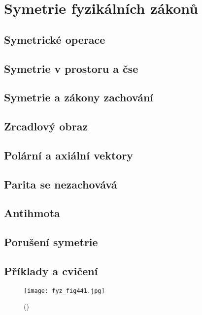 \chapter{Symetrie fyzikálních zákonů}\label{fyz:IchapLII}
\minitoc
  \section{Symetrické operace}\label{fyz:IchapLIIsecI}
  \section{Symetrie v prostoru a čse}\label{fyz:IchapLIIsecII}
  \section{Symetrie a zákony zachování}\label{fyz:IchapLIIsecIII}
  \section{Zrcadlový obraz}\label{fyz:IchapLIIsecIV}
  \section{Polární a axiální vektory}\label{fyz:IchapLIIsecV}
  \section{Parita se nezachovává}\label{fyz:IchapLIIsecVI}
  \section{Antihmota}\label{fyz:IchapLIIsecVII}
  \section{Porušení symetrie}\label{fyz:IchapLIIsecVIII}
  \section{Příklady a cvičení}\label{fyz:IchapLIIsecIX}
  
    \begin{figure}[ht!] %
      \centering
      \texttt{[image: fyz\_fig441.jpg]}
      \caption{
               (\cite[s.~704]{Feynman01})}
      \label{fyz_fig441}
    \end{figure}

